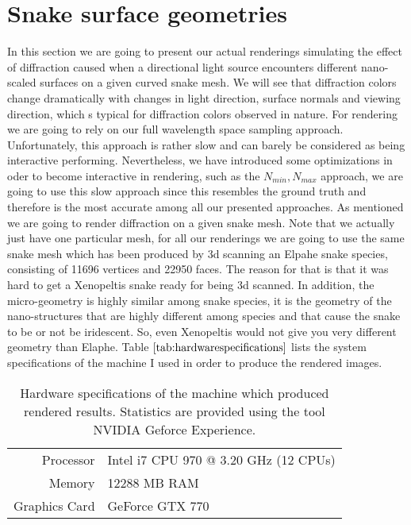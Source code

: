 \section{Snake surface geometries}
\label{sec:snakegeomrenderings}
In this section we are going to present our actual renderings simulating the effect of diffraction caused when a directional light source encounters different nano-scaled surfaces on a given curved snake mesh. We will see that diffraction colors change dramatically with changes in light direction, surface normals and viewing direction, which s typical for diffraction colors observed in nature. For rendering we are going to rely on our full wavelength space sampling approach. Unfortunately, this approach is rather slow and can barely be considered as being interactive performing. Nevertheless, we have introduced some optimizations in oder to become interactive in rendering, such as the $N_{min}, N_{max}$ approach, we are going to use this slow approach since this resembles the ground truth and therefore is the most accurate among all our presented approaches. As mentioned we are going to render diffraction on a given snake mesh. Note that we actually just have one particular mesh, for all our renderings we are going to use the same snake mesh which has been produced by 3d scanning an Elpahe snake species, consisting of 11696 vertices and 22950 faces. The reason for that is that it was hard to get a Xenopeltis snake ready for being 3d scanned. In addition, the micro-geometry is highly similar among snake species, it is the geometry of the nano-structures that are highly different among species and that cause the snake to be or not be iridescent. So, even Xenopeltis would not give you very different geometry than Elaphe. Table $\ref{tab:hardwarespecifications}$ lists the system specifications of the machine I used in order to produce the rendered images.

\begin{table}[H]
  \centering
  \begin{tabular}{|r|l|}
    \hline
    Processor & Intel i7 CPU 970 @ 3.20 GHz (12 CPUs) \\
    Memory & 12288 MB RAM \\
    Graphics Card & GeForce GTX 770 \\
    \hline  
  \end{tabular}
\caption[Hardware Specifications]{Hardware specifications of the machine which produced rendered results. Statistics are provided using the tool NVIDIA Geforce Experience.}
\label{tab:hardwarespecifications}
\end{table}


